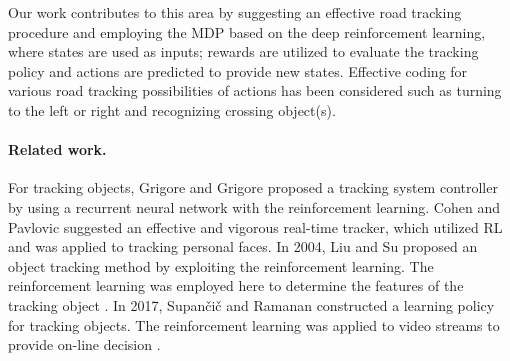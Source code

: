 \documentclass{svproc}
\begin{document}
	Our work contributes to this area by suggesting an effective road tracking procedure and employing the MDP based on the deep reinforcement learning, where states are used as inputs; rewards are utilized to evaluate the tracking policy and actions are predicted to provide new states. Effective coding for various road tracking possibilities of actions has been considered such as turning to the left or right and recognizing crossing object(s). 
	\paragraph{Related work.}  %
	For tracking objects, Grigore and Grigore \cite{Grigore2000Reinforcement} proposed a tracking system controller by using a recurrent neural network with the reinforcement learning. %
	Cohen and Pavlovic \cite{Cohen2010Reinforcement} suggested an effective and vigorous real-time tracker, which utilized RL and was applied to tracking personal faces. In 2004, Liu and Su proposed an object tracking method by exploiting the reinforcement learning. The reinforcement learning was employed here to determine the features of the tracking object \cite{Liu2004Reinforcement}. In 2017, Supan\v{c}i\v{c} and Ramanan constructed a learning policy for tracking objects. The reinforcement learning was applied to video streams to provide on-line decision \cite{Supancic2017Tracking}. 
	
\end{document}
